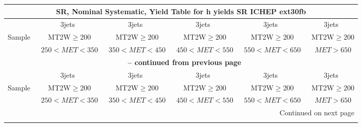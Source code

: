\documentclass{article}
\begin{document}
\begin{longtable}{|l|c|c|c|c|c|} 
 
\multicolumn{6}{c}{ SR, Nominal Systematic, Yield Table for h yields SR ICHEP ext30fb }\\* \hline 
  & 3jets  & 3jets  & 3jets  & 3jets  & 3jets \\* 
Sample  & ~MT2W$\ge$200  & ~MT2W$\ge$200  & ~MT2W$\ge$200  & ~MT2W$\ge$200  & ~MT2W$\ge$200 \\* 
  & ~$250<MET<350$  & ~$350<MET<450$  & ~$450<MET<550$  & ~$550<MET<650$  & ~$MET>650$ \\* 
\hline \hline 
\endfirsthead 
 
\multicolumn{6}{c}{{\bfseries \tablename\ \thetable{} -- continued from previous page}}\\* \hline 
  & 3jets  & 3jets  & 3jets  & 3jets  & 3jets \\* 
Sample  & ~MT2W$\ge$200  & ~MT2W$\ge$200  & ~MT2W$\ge$200  & ~MT2W$\ge$200  & ~MT2W$\ge$200 \\* 
  & ~$250<MET<350$  & ~$350<MET<450$  & ~$450<MET<550$  & ~$550<MET<650$  & ~$MET>650$ \\* 
\hline \hline 
\endhead 
 
\multicolumn{6}{|r|}{{Continued on next page}}\\* \hline 
\endfoot 
 
 
\endlastfoot 
 

\end{longtable}
\end{document}
